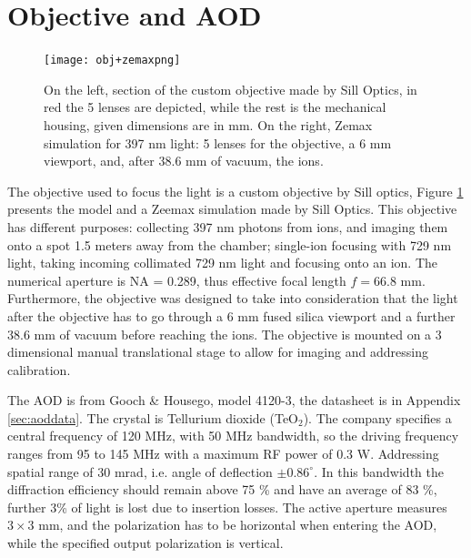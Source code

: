 \section{Objective and AOD}
\label{sec:obj}
%
\begin{figure}
      \centering
          \centering
          \texttt{[image: obj+zemaxpng]}
           \caption{On the left, section of the custom objective made by Sill Optics, in red the 5 lenses are depicted, while the rest is the mechanical housing, given dimensions are in mm. On the right, Zemax simulation for 397 nm light: 5 lenses for the objective, a 6 mm viewport, and, after 38.6 mm of vacuum, the ions.}
          \label{objsection}
\end{figure}
The objective used to focus the light is a custom objective by Sill optics, Figure \ref{objsection} presents the model and a Zeemax simulation made by Sill Optics. This objective has different purposes: collecting 397 nm photons from ions, and imaging them onto a spot 1.5 meters away from the chamber; single-ion focusing with 729 nm light, taking incoming collimated 729 nm light and focusing onto an ion. The numerical aperture is NA = 0.289, thus effective focal length $f = 66.8$ mm. Furthermore, the objective was designed to take into consideration that the light after the objective has to go through a 6 mm fused silica viewport and a further 38.6 mm of vacuum before reaching the ions. The objective is mounted on a 3 dimensional manual translational stage to allow for imaging and addressing calibration.\par
The AOD is from Gooch \& Housego, model 4120-3, the datasheet is in Appendix \ref{sec:aoddata}. The crystal is Tellurium dioxide (TeO$_2$). The company specifies a central frequency of 120 MHz, with 50 MHz bandwidth, so the driving frequency ranges from 95 to 145 MHz with a maximum RF power of 0.3 W. Addressing spatial range of 30 mrad, i.e. angle of deflection $\pm 0.86^{\circ}$. In this bandwidth the diffraction efficiency should remain above 75 \% and have an average of 83 \%, further 3\% of light is lost due to insertion losses. The active aperture measures $3\times 3$ mm, and the polarization has to be horizontal when entering the AOD, while the specified output polarization is vertical.

